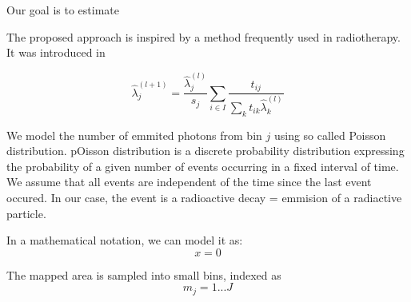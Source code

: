 Our goal is to estimate 

The proposed approach is inspired by a method frequently used in radiotherapy. 
It was introduced in \cite{wilderman}




\begin{equation}
\hat{\lambda}_{j}^{(l+1)} = \frac{\hat{\lambda}_{j}^{(l)}}{s_{j}} \sum_{i \in I} \frac{t_{ij}}{\sum_{k} t_{ik} \hat{\lambda}_{k}^{(l)}}
\end{equation}




We model the number of emmited photons from bin $j$ using so called Poisson distribution.
pOisson distribution is a discrete probability distribution expressing the probability of a given number of events occurring in a fixed interval of time.
We assume that all events are independent of the time since the last event occured.
In our case, the event is a radioactive decay = emmision of a radiactive particle.

In a mathematical notation, we can model it as:
\begin{equation}
  x = 0
\end{equation}


The mapped area is sampled into small bins, indexed as 
\begin{equation}
  m_{j} = 1 ... J
\end{equation}

